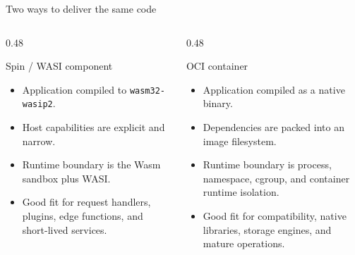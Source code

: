 \documentclass[aspectratio=169,10pt]{beamer}
\begin{document}
\begin{frame}{Two ways to deliver the same code}
  \begin{columns}[T,onlytextwidth]
    \begin{column}{0.48\linewidth}
      \begin{exampleblock}{Spin / WASI component}
        \begin{itemize}
          \item Application compiled to \texttt{wasm32-wasip2}.
          \item Host capabilities are explicit and narrow.
          \item Runtime boundary is the Wasm sandbox plus WASI.
          \item Good fit for request handlers, plugins, edge functions, and short-lived services.
        \end{itemize}
      \end{exampleblock}
    \end{column}
    \begin{column}{0.48\linewidth}
      \begin{alertblock}{OCI container}
        \begin{itemize}
          \item Application compiled as a native binary.
          \item Dependencies are packed into an image filesystem.
          \item Runtime boundary is process, namespace, cgroup, and container runtime isolation.
          \item Good fit for compatibility, native libraries, storage engines, and mature operations.
        \end{itemize}
      \end{alertblock}
    \end{column}
  \end{columns}
\end{frame}
\end{document}
